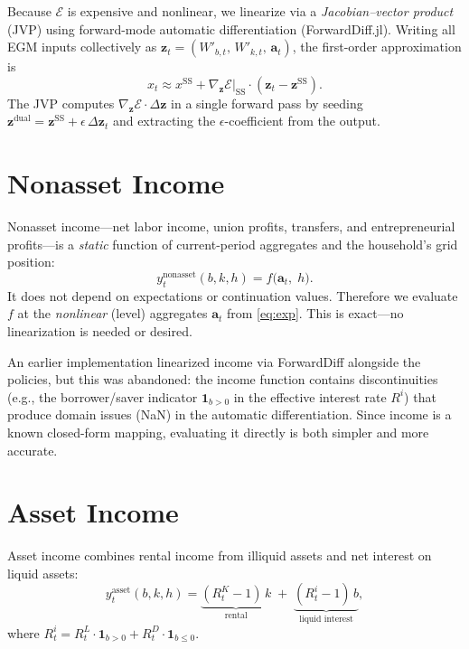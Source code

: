 \documentclass[11pt]{article}
\newcommand{\SS}{\mathrm{SS}}
\begin{document}
Because $\mathcal{E}$ is expensive and nonlinear, we linearize via a
\emph{Jacobian--vector product} (JVP) using forward-mode automatic differentiation
(ForwardDiff.jl). Writing all EGM inputs collectively as
$\mathbf{z}_t = (W'_{b,t},\, W'_{k,t},\, \mathbf{a}_t)$, the first-order
approximation is
\begin{equation}
    x_t \approx x^{\SS} + \nabla_{\mathbf{z}} \mathcal{E}\big|_{\SS}
                           \cdot (\mathbf{z}_t - \mathbf{z}^{\SS}).
\end{equation}
The JVP computes $\nabla_{\mathbf{z}} \mathcal{E} \cdot \Delta\mathbf{z}$
in a single forward pass by seeding
$\mathbf{z}^{\text{dual}} = \mathbf{z}^{\SS} + \epsilon\,\Delta\mathbf{z}_t$
and extracting the $\epsilon$-coefficient from the output.

\section{Nonasset Income}\label{sec:nonasset}

Nonasset income---net labor income, union profits, transfers, and entrepreneurial
profits---is a \emph{static} function of current-period aggregates and the
household's grid position:
\begin{equation}
    y^{\text{nonasset}}_t(b,k,h) = f\!\bigl(\mathbf{a}_t,\; h\bigr).
\end{equation}
It does not depend on expectations or continuation values. Therefore we evaluate
$f$ at the \emph{nonlinear} (level) aggregates $\mathbf{a}_t$ from \eqref{eq:exp}.
This is exact---no linearization is needed or desired.

An earlier implementation linearized income via ForwardDiff alongside the policies,
but this was abandoned: the income function contains discontinuities
(e.g., the borrower/saver indicator $\mathbf{1}_{b > 0}$ in the effective interest
rate $R^i$) that produce domain issues (NaN) in the automatic differentiation.
Since income is a known closed-form mapping, evaluating it directly is both
simpler and more accurate.

\section{Asset Income}\label{sec:asset}

Asset income combines rental income from illiquid assets and net interest on
liquid assets:
\begin{equation}\label{eq:asset_nl}
    y^{\text{asset}}_t(b,k,h) = \underbrace{(R^K_t - 1)\, k}_{\text{rental}}
                               \;+\; \underbrace{(R^i_t - 1)\, b}_{\text{liquid interest}},
\end{equation}
where $R^i_t = R^L_t \cdot \mathbf{1}_{b>0} + R^D_t \cdot \mathbf{1}_{b\leq 0}$.
\end{document}
